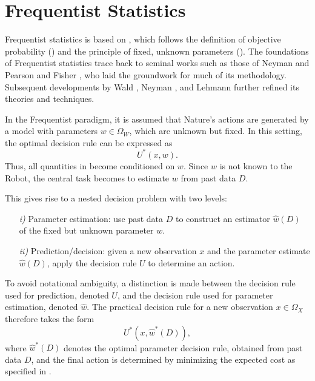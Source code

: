 \section{Frequentist Statistics}
\label{chp:freq}
Frequentist statistics is based on , which follows the definition of objective probability () and the principle of fixed, unknown parameters (). The foundations of Frequentist statistics trace back to seminal works such as those of Neyman and Pearson \citep{Neyman1928OnSR} and Fisher \citep{fisher1925statistical}, who laid the groundwork for much of its methodology. Subsequent developments by Wald \citep{Wald1945Sequential}, Neyman \citep{Neyman1948Consistent}, and Lehmann \citep{lehmann1986testing} further refined its theories and techniques.\newline

In the Frequentist paradigm, it is assumed that Nature's actions are generated by a model with parameters $w \in \Omega_W$, which are unknown but fixed. In this setting, the optimal decision rule can be expressed as
\begin{equation}
	U^*(x,w).
\end{equation}
Thus, all quantities in  become conditioned on $w$. Since $w$ is not known to the Robot, the central task becomes to estimate $w$ from past data $D$. 

This gives rise to a nested decision problem with two levels:
\begin{enumerate}
	\item[\textit{i)}] Parameter estimation: use past data $D$ to construct an estimator $\hat{w}(D)$ of the fixed but unknown parameter $w$.
	\item[\textit{ii)}] Prediction/decision: given a new observation $x$ and the parameter estimate $\hat{w}(D)$, apply the decision rule $U$ to determine an action.
\end{enumerate}

To avoid notational ambiguity, a distinction is made between the decision rule used for prediction, denoted $U$, and the decision rule used for parameter estimation, denoted $\hat{w}$. The practical decision rule for a new observation $x \in \Omega_X$ therefore takes the form
\begin{equation}
	U^*(x, \hat{w}^*(D)),
\end{equation}
where $\hat{w}^*(D)$ denotes the optimal parameter decision rule, obtained from past data $D$, and the final action is determined by minimizing the expected cost as specified in .



